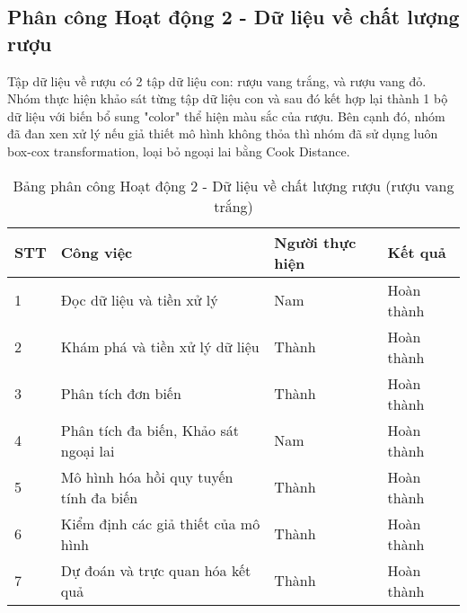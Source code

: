 \subsection{Phân công Hoạt động 2 - Dữ liệu về chất lượng rượu}

Tập dữ liệu về rượu có 2 tập dữ liệu con: rượu vang trắng, và rượu vang đỏ. Nhóm thực hiện khảo sát từng tập dữ liệu con và sau đó kết hợp lại thành 1 bộ dữ liệu với biến bổ sung "color" thể hiện màu sắc của rượu. Bên cạnh đó, nhóm đã đan xen xử lý nếu giả thiết mô hình không thỏa thì nhóm đã sử dụng luôn box-cox transformation, loại bỏ ngoại lai bằng Cook Distance.

\begin{table}[H]
    \centering 
    \caption{Bảng phân công Hoạt động 2 - Dữ liệu về chất lượng rượu (rượu vang trắng)}
    \label{tab:phancong2}
    \begin{tabular}{|l|l|l|l|}
    \hline
    STT & Công việc                                                   & Người thực hiện & Kết quả    \\ \hline
    1   & Đọc dữ liệu và tiền xử lý                                   & Nam             & Hoàn thành \\ \hline
    2   & Khám phá và tiền xử lý dữ liệu                              & Thành           & Hoàn thành \\ \hline
    3   & Phân tích đơn biến                                          & Thành           & Hoàn thành \\ \hline
    4   & Phân tích đa biến, Khảo sát ngoại lai                       & Nam             & Hoàn thành \\ \hline
    5   & Mô hình hóa hồi quy tuyến tính đa biến                         & Thành           & Hoàn thành \\ \hline
    6   & Kiểm định các giả thiết của mô hình                        & Thành           & Hoàn thành \\ \hline
    7  & Dự đoán và trực quan hóa kết quả                            & Thành             & Hoàn thành \\ \hline
    \end{tabular}
\end{table}

